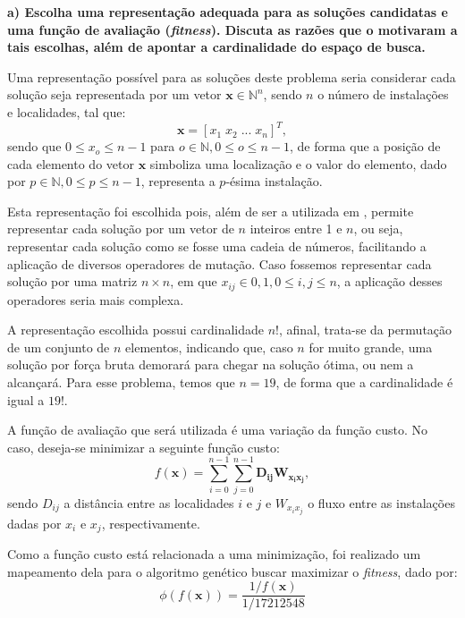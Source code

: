 \documentclass[a4paper, 12pt]{article}
\begin{document}
\textbf{a) Escolha uma representação adequada para as soluções candidatas e uma função de avaliação (\textit{fitness}). Discuta as razões que o motivaram a tais escolhas, além de apontar a cardinalidade do espaço de busca.}

Uma representação possível para as soluções deste problema seria considerar cada solução seja representada por um vetor $\mathbf{x} \in \mathbb{N}^n$, sendo $n$ o número de instalações e localidades, tal que:
$$\mathbf{x} = [x_1 \; x_2 \; ... \; x_{n}]^T,$$ 
sendo que $0 \leq x_o \leq n - 1$ para $o \in \mathbb{N}, 0 \leq o \leq n - 1$, de forma que a posição de cada elemento do vetor $\mathbf{x}$ simboliza uma localização e o valor do elemento, dado por $p \in \mathbb{N}, 0 \leq p \leq n - 1$, representa a $p$-ésima instalação.

Esta representação foi escolhida pois, além de ser a utilizada em \cite{elshafei1977hospital}, permite representar cada solução por um vetor de $n$ inteiros entre 1 e $n$, ou seja, representar cada solução como se fosse uma cadeia de números, facilitando a aplicação de diversos operadores de mutação. Caso fossemos representar cada solução por uma matriz $n \times n$, em que $x_{ij} \in 0, 1, 0 \leq i, j \leq n$, a aplicação desses operadores seria mais complexa.

A representação escolhida possui cardinalidade $n!$, afinal, trata-se da permu\-tação de um conjunto de $n$ elementos, indicando que, caso $n$ for muito grande, uma solução por força bruta demorará para chegar na solução ótima, ou nem a alcançará. Para esse problema, temos que $n = 19$, de forma que a cardinalidade é igual a $19!$.

A função de avaliação que será utilizada é uma variação da função custo. No caso, deseja-se minimizar a seguinte função custo:
\begin{equation}\label{eq:custo}
    f(\mathbf{x}) = \sum_{i = 0}^{n - 1}  \sum_{j = 0}^{n - 1} \bm{D_{ij}} \bm{W_{x_{i} x_{j}}},
\end{equation}
sendo $D_{ij}$ a distância entre as localidades $i$ e $j$ e $W_{x_{i} x_{j}}$ o fluxo entre as instalações dadas por $x_i$ e $x_j$, respectivamente. 

Como a função custo está relacionada a uma minimização, foi realizado um mapeamento dela para o algoritmo genético buscar maximizar o \textit{fitness}, dado por:
\begin{equation}\label{eq:fitness}
    \phi(f(\mathbf{x})) = \frac{1/f(\mathbf{x})}{1/17212548}
\end{equation}
\end{document}
